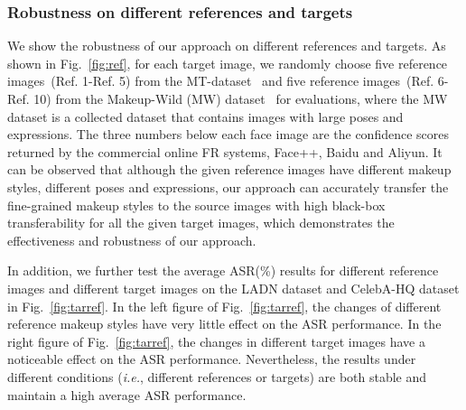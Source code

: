 \documentclass[10pt,journal,compsoc]{IEEEtran}
\begin{document}
\subsubsection{Robustness on different references and targets}
We show the robustness of our approach on different references and targets. As shown in Fig.~\ref{fig:ref}, for each target image, we randomly choose five reference images~(Ref. 1-Ref. 5) from the MT-dataset~\cite{li2018beautygan} and five reference images~(Ref. 6-Ref. 10) from the Makeup-Wild (MW) dataset~\cite{jiang2020psgan} for evaluations, where the MW dataset is a collected dataset that contains images with large poses and expressions. The three numbers below each face image are the confidence scores returned by the commercial online FR systems, Face++, Baidu and Aliyun. It can be observed that although the given reference images have different makeup styles, different poses and expressions, our approach can accurately transfer the fine-grained makeup styles to the source images with high black-box transferability for all the given target images, which demonstrates the effectiveness and robustness of our approach.

In addition, we further test the average ASR(\%) results for different reference images and different target images on the LADN dataset and CelebA-HQ dataset in Fig.~\ref{fig:tarref}. 
In the left figure of Fig.~\ref{fig:tarref}, the changes of different reference makeup styles have very little effect on the ASR performance. In the right figure of Fig.~\ref{fig:tarref}, the changes in different target images have a noticeable effect on the ASR performance. Nevertheless, the results under different conditions (\emph{i.e.}, different references or targets) are both stable and maintain a high average ASR performance.
\end{document}
